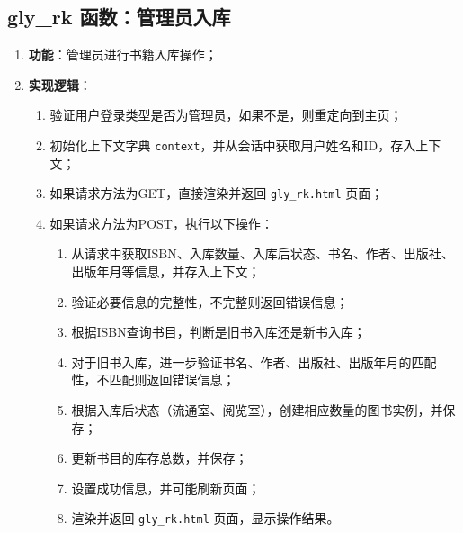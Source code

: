 \documentclass{ctexart}
\begin{document}
\subsection{gly\_rk 函数：管理员入库}
\begin{enumerate}
    \item \textbf{功能}：管理员进行书籍入库操作；
    \item \textbf{实现逻辑}：
    \begin{enumerate}
        \item 验证用户登录类型是否为管理员，如果不是，则重定向到主页；
        \item 初始化上下文字典 \texttt{context}，并从会话中获取用户姓名和ID，存入上下文；
        \item 如果请求方法为GET，直接渲染并返回 \texttt{gly\_rk.html} 页面；
        \item 如果请求方法为POST，执行以下操作：
        \begin{enumerate}
            \item 从请求中获取ISBN、入库数量、入库后状态、书名、作者、出版社、出版年月等信息，并存入上下文；
            \item 验证必要信息的完整性，不完整则返回错误信息；
            \item 根据ISBN查询书目，判断是旧书入库还是新书入库；
            \item 对于旧书入库，进一步验证书名、作者、出版社、出版年月的匹配性，不匹配则返回错误信息；
            \item 根据入库后状态（流通室、阅览室），创建相应数量的图书实例，并保存；
            \item 更新书目的库存总数，并保存；
            \item 设置成功信息，并可能刷新页面；
            \item 渲染并返回 \texttt{gly\_rk.html} 页面，显示操作结果。
        \end{enumerate}
    \end{enumerate}
\end{enumerate}
\end{document}
